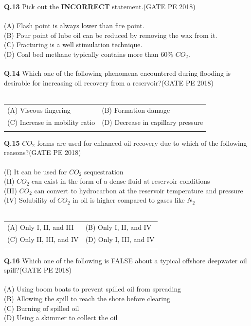\documentclass[12pt,a4paper]{article}
\begin{document}
\noindent
\textbf{Q.13} Pick out the \textbf{INCORRECT} statement.\hfill(GATE PE 2018)\\\\
(A) Flash point is always lower than fire point.\\
(B) Pour point of lube oil can be reduced by removing the wax from it.\\
(C) Fracturing is a well stimulation technique.\\
(D) Coal bed methane typically contains more than 60\% $CO_2$.\\\\ 

\noindent
\textbf{Q.14} Which one of the following phenomena encountered during flooding is desirable for
increasing oil recovery from a reservoir?\hfill(GATE PE 2018)\\\\
\begin{tabular}{ll}
	(A) Viscous fingering  & (B) Formation damage\\
	(C) Increase in mobility ratio & (D) Decrease in capillary pressure\\\\
\end{tabular}

\noindent
\textbf{Q.15} \hspace{0.5em}$CO_2$ foams are used for enhanced oil recovery due to which of the following reasons?\hfill(GATE PE 2018)\\\\
(I) It can be used for $CO_2$ sequestration\\
(II) $CO_2$ can exist in the form of a dense fluid at reservoir conditions\\
(III) $CO_2$ can convert to hydrocarbon at the reservoir temperature and pressure\\
(IV) Solubility of $CO_2$ in oil is higher compared to gases like $N_2$\\\\
\begin{tabular}{ll}
	(A) Only I, II, and III & (B) Only I, II, and IV\\
	(C) Only II, III, and IV & (D) Only I, III, and IV\\\\
\end{tabular}


\pagebreak

\noindent
\textbf{Q.16}\hspace{0.5em} Which one of the following is FALSE about a typical offshore deepwater oil spill?\hfill(GATE PE 2018)\\\\
(A) Using boom boats to prevent spilled oil from spreading\\
(B) Allowing the spill to reach the shore before clearing\\
(C) Burning of spilled oil\\
(D) Using a skimmer to collect the oil\\\\
\end{document}
